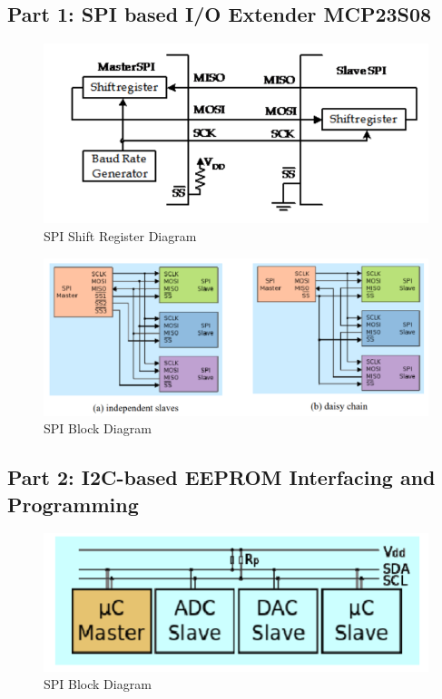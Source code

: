 \documentclass{article}
\begin{document}
	\subsection*{Part 1: SPI based I/O Extender MCP23S08}
	\begin{figure}[H]
		\centering
		\includegraphics[scale=0.75]{SPI_BD_1}
		\caption{SPI Shift Register Diagram}
	\end{figure}
	\begin{figure}[H]
		\centering
		\includegraphics[scale=0.75]{SPI_BD_2}
		\caption{SPI Block Diagram}
	\end{figure}
	\subsection*{Part 2: I2C-based EEPROM Interfacing and Programming}
	\begin{figure}[H]
		\centering
		\includegraphics[scale=0.75]{I2C_BD}
		\caption{SPI Block Diagram}
	\end{figure}
\end{document}
